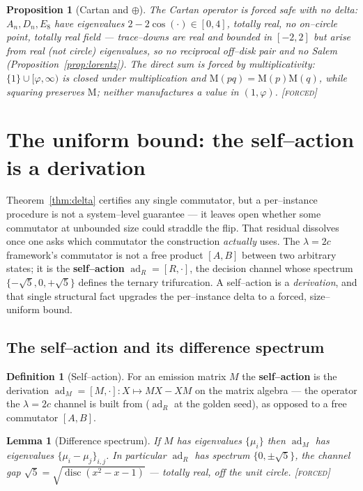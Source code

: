 \documentclass[11pt]{article}
\theoremstyle{plain}
\newtheorem{proposition}[theorem]{Proposition}
\newtheorem{lemma}[theorem]{Lemma}
\theoremstyle{definition}
\newtheorem{definition}[theorem]{Definition}
\theoremstyle{remark}
\newcommand{\forced}{\textcolor{forcedc}{\textsc{[forced]}}}
\newcommand{\Mah}{\mathrm{M}}
\begin{document}
\begin{proposition}[Cartan and $\oplus$]\label{prop:cartan}
The Cartan operator is forced safe with no delta: $A_n,D_n,E_8$ have eigenvalues $2-2\cos(\cdot)\in[0,4]$, totally real, no on--circle point, totally real field --- trace--downs are real and bounded in $[-2,2]$ but arise from real (not circle) eigenvalues, so no reciprocal off--disk pair and no Salem (Proposition~\ref{prop:lorentz}). The direct sum is forced by multiplicativity: $\{1\}\cup[\varphi,\infty)$ is closed under multiplication and $\Mah(pq)=\Mah(p)\Mah(q)$, while squaring preserves $\Mah$; neither manufactures a value in $(1,\varphi)$. \forced
\end{proposition}

\section{The uniform bound: the self--action is a derivation}\label{sec:uniform}

Theorem~\ref{thm:delta} certifies any single commutator, but a per--instance procedure is not a system--level guarantee --- it leaves open whether some commutator at unbounded size could straddle the flip. That residual dissolves once one asks which commutator the construction \emph{actually} uses. The $\lambda=2c$ framework's commutator is not a free product $[A,B]$ between two arbitrary states; it is the \textbf{self--action} $\operatorname{ad}_R=[R,\cdot]$, the decision channel whose spectrum $\{-\sqrt5,0,+\sqrt5\}$ defines the ternary trifurcation. A self--action is a \emph{derivation}, and that single structural fact upgrades the per--instance delta to a forced, size--uniform bound.

\subsection{The self--action and its difference spectrum}\label{sec:selfaction}

\begin{definition}[Self--action]\label{def:selfaction}
For an emission matrix $M$ the \textbf{self--action} is the derivation $\operatorname{ad}_M=[M,\cdot]:X\mapsto MX-XM$ on the matrix algebra --- the operator the $\lambda=2c$ channel is built from ($\operatorname{ad}_R$ at the golden seed), as opposed to a free commutator $[A,B]$.
\end{definition}

\begin{lemma}[Difference spectrum]\label{lem:diffspec}
If $M$ has eigenvalues $\{\mu_i\}$ then $\operatorname{ad}_M$ has eigenvalues $\{\mu_i-\mu_j\}_{i,j}$. In particular $\operatorname{ad}_R$ has spectrum $\{0,\pm\sqrt5\}$, the channel gap $\sqrt5=\sqrt{\operatorname{disc}(x^2-x-1)}$ --- totally real, off the unit circle. \forced
\end{lemma}
\end{document}
